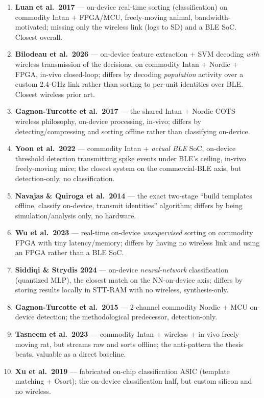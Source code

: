 \documentclass[11pt]{article}
\begin{document}
\begin{enumerate}[nosep]
\item \textbf{Luan et al.\ 2017} --- on-device real-time sorting (classification) on commodity Intan + FPGA/MCU, freely-moving animal, bandwidth-motivated; missing only the wireless link (logs to SD) and a BLE SoC. Closest overall.
\item \textbf{Bilodeau et al.\ 2026} --- on-device feature extraction + SVM decoding \emph{with} wireless transmission of the decisions, on commodity Intan + Nordic + FPGA, in-vivo closed-loop; differs by decoding \emph{population} activity over a custom 2.4-GHz link rather than sorting to per-unit identities over BLE. Closest wireless prior art.
\item \textbf{Gagnon-Turcotte et al.\ 2017} --- the shared Intan + Nordic COTS wireless philosophy, on-device processing, in-vivo; differs by detecting/compressing and sorting offline rather than classifying on-device.
\item \textbf{Yoon et al.\ 2022} --- commodity Intan + \emph{actual BLE} SoC, on-device threshold detection transmitting spike events under BLE's ceiling, in-vivo freely-moving mice; the closest system on the commercial-BLE axis, but detection-only, no classification.
\item \textbf{Navajas \& Quiroga et al.\ 2014} --- the exact two-stage ``build templates offline, classify on-device, transmit identities'' algorithm; differs by being simulation/analysis only, no hardware.
\item \textbf{Wu et al.\ 2023} --- real-time on-device \emph{unsupervised} sorting on commodity FPGA with tiny latency/memory; differs by having no wireless link and using an FPGA rather than a BLE SoC.
\item \textbf{Siddiqi \& Strydis 2024} --- on-device \emph{neural-network} classification (quantized MLP), the closest match on the NN-on-device axis; differs by storing results locally in STT-RAM with no wireless, synthesis-only.
\item \textbf{Gagnon-Turcotte et al.\ 2015} --- 2-channel commodity Nordic + MCU on-device detection; the methodological predecessor, detection-only.
\item \textbf{Tasneem et al.\ 2023} --- commodity Intan + wireless + in-vivo freely-moving rat, but streams raw and sorts offline; the anti-pattern the thesis beats, valuable as a direct baseline.
\item \textbf{Xu et al.\ 2019} --- fabricated on-chip classification ASIC (template matching + Osort); the on-device classification half, but custom silicon and no wireless.

\end{enumerate}
\end{document}
